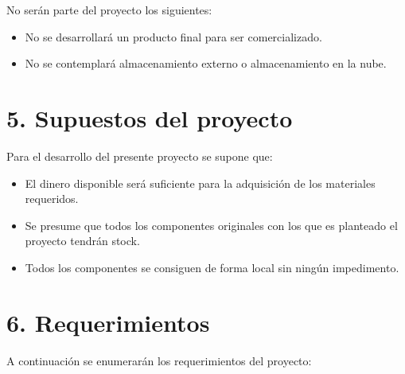 \documentclass[
11pt, %
codirector, %
]{charter}
\begin{document}
No serán parte del proyecto los siguientes:

\begin{itemize}
	\item No se desarrollará un producto final para ser comercializado.
	\item No se contemplará almacenamiento externo o almacenamiento en la nube.
  
\end{itemize}

\section{5. Supuestos del proyecto}
\label{sec:supuestos}


Para el desarrollo del presente proyecto se supone que:

\begin{itemize}
	\item El dinero disponible será suficiente para la adquisición de los materiales requeridos.
	\item Se presume que todos los componentes originales con los que es planteado el proyecto tendrán stock.
 \item Todos los componentes se consiguen de forma local sin ningún impedimento.
  
\end{itemize}

\newpage

\section{6. Requerimientos}
\label{sec:requerimientos}


A continuación se enumerarán los requerimientos del proyecto:
\end{document}
